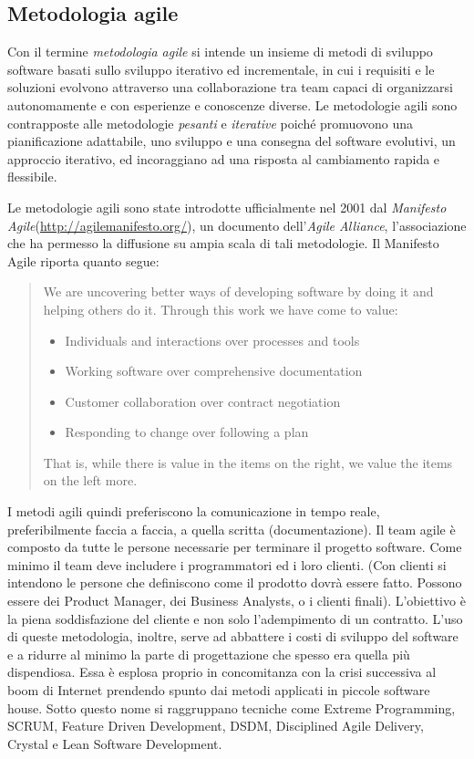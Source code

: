 \subsection{Metodologia agile}
Con il termine \textit{metodologia agile} si intende un insieme di metodi di sviluppo software basati sullo sviluppo iterativo ed incrementale, in cui i requisiti e le soluzioni evolvono attraverso una collaborazione tra team capaci di organizzarsi autonomamente e con esperienze e conoscenze diverse.
Le metodologie agili sono contrapposte alle metodologie \textit{pesanti} e \textit{iterative} poiché promuovono una pianificazione adattabile, uno sviluppo e una consegna del software evolutivi, un approccio iterativo, ed incoraggiano ad una risposta al cambiamento rapida e flessibile.

Le metodologie agili sono state introdotte ufficialmente nel 2001 dal \textit{Manifesto Agile}(\url{http://agilemanifesto.org/}), un documento dell'\textit{Agile Alliance}, l'associazione che ha permesso la diffusione su ampia scala di tali metodologie.
Il Manifesto Agile riporta quanto segue:
\begin{quotation}
\begin{emph}
We are uncovering better ways of developing software by doing it and helping others do it. Through this work we have come to value:
\begin{itemize}
\item[ ] Individuals and interactions over processes and tools
\item[ ] Working software over comprehensive documentation
\item[ ] Customer collaboration over contract negotiation
\item[ ] Responding to change over following a plan
\end{itemize}
That is, while there is value in the items on the right, we value the items on the left more.
\end{emph}
\end{quotation}
I metodi agili quindi preferiscono la comunicazione in tempo reale, preferibilmente faccia a faccia, a quella scritta (documentazione). Il team agile è composto da tutte le persone necessarie per terminare il progetto software. Come minimo il team deve includere i programmatori ed i loro clienti. (Con clienti si intendono le persone che definiscono come il prodotto dovrà essere fatto. Possono essere dei Product Manager, dei Business Analysts, o i clienti finali). L'obiettivo è la piena soddisfazione del cliente e non solo l'adempimento di un contratto. 
L'uso di queste metodologia, inoltre, serve ad abbattere i costi di sviluppo del software e a ridurre al minimo la parte di progettazione che spesso era quella più dispendiosa. Essa è esplosa proprio in concomitanza con la crisi successiva al boom di Internet prendendo spunto dai metodi applicati in piccole software house. Sotto questo nome si raggruppano tecniche come Extreme Programming, SCRUM, Feature Driven Development, DSDM, Disciplined Agile Delivery, Crystal e Lean Software Development.

